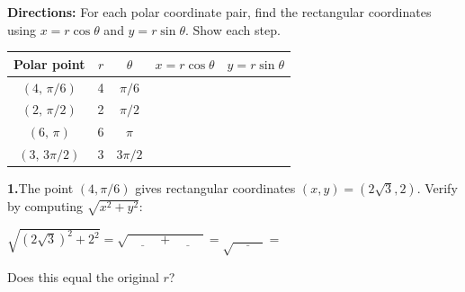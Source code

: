 \documentclass[10pt]{article}
\begin{document}
\begin{tcolorbox}[colback=white, colframe=black!40,
    title=\textbf{Tier R --- Reinforce},
    fonttitle=\bfseries, arc=2mm, left=3mm, right=3mm, top=2mm, bottom=2mm]

\textbf{Directions:} For each polar coordinate pair, find the rectangular
coordinates using $x = r\cos\theta$ and $y = r\sin\theta$. Show each step.

\vspace{6pt}
\renewcommand{\arraystretch}{2.2}
\begin{tabular}{|c|c|c|c|c|}
\hline
\textbf{Polar point} & \textbf{$r$} & \textbf{$\theta$} & \textbf{$x = r\cos\theta$} & \textbf{$y = r\sin\theta$} \\
\hline
$(4,\, \pi/6)$ & 4 & $\pi/6$ & \underline{\hspace{2.8cm}} & \underline{\hspace{2.8cm}} \\
\hline
$(2,\, \pi/2)$ & 2 & $\pi/2$ & \underline{\hspace{2.8cm}} & \underline{\hspace{2.8cm}} \\
\hline
$(6,\, \pi)$ & 6 & $\pi$ & \underline{\hspace{2.8cm}} & \underline{\hspace{2.8cm}} \\
\hline
$(3,\, 3\pi/2)$ & 3 & $3\pi/2$ & \underline{\hspace{2.8cm}} & \underline{\hspace{2.8cm}} \\
\hline
\end{tabular}

\vspace{8pt}
\textbf{1.}\quad The point $(4, \pi/6)$ gives rectangular coordinates
$(x,y) = (2\sqrt{3}, 2)$. Verify by computing $\sqrt{x^2+y^2}$:

\vspace{4pt}
$\sqrt{(2\sqrt{3})^2 + 2^2} = \sqrt{\underline{\hspace{1cm}} + \underline{\hspace{1cm}}} = \sqrt{\underline{\hspace{1cm}}} = $ \underline{\hspace{1.5cm}}

Does this equal the original $r$? \underline{\hspace{1.2cm}}


\end{tcolorbox}
\end{document}
